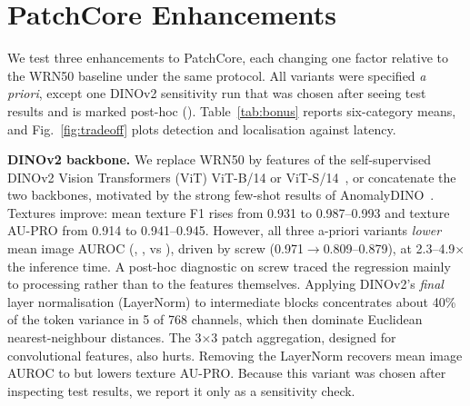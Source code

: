 \section{PatchCore Enhancements}
\label{sec:enh}

We test three enhancements to PatchCore, each changing one factor relative to the WRN50 baseline under the same protocol.
All variants were specified \emph{a priori}, except one DINOv2 sensitivity run that was chosen after seeing test results and is marked post-hoc (\posthoc).
Table~\ref{tab:bonus} reports six-category means, and Fig.~\ref{fig:tradeoff} plots detection and localisation against latency.

\begin{table}[t]
  \centering
  \caption{PatchCore enhancements, six-category means. Bold marks the best value among a-priori variants. \posthoc{}Post-hoc and test-informed; shown as a sensitivity check and not selectable. The input-pyramid and post-processing rows score images by the smoothed-map maximum and should be compared with the max-score control rather than with the Eq.~\eqref{eq:reweight} baseline.}
  \label{tab:bonus}
  \footnotesize
  
\end{table}

\textbf{DINOv2 backbone.}
We replace WRN50 by features of the self-supervised DINOv2 Vision Transformers (ViT) ViT-B/14 or ViT-S/14~\cite{oquab2024dinov2}, or concatenate the two backbones, motivated by the strong few-shot results of AnomalyDINO~\cite{damm2025anomalydino}.
Textures improve: mean texture F1 rises from 0.931 to 0.987--0.993 and texture AU-PRO from 0.914 to 0.941--0.945.
However, all three a-priori variants \emph{lower} mean image AUROC (\bnDinoBImgAuroc{}, \bnDinoSImgAuroc{}, \bnWrnDinoImgAuroc{} vs \bnBaseImgAuroc{}), driven by screw (0.971$\to$0.809--0.879), at 2.3--4.9$\times$ the inference time.
A post-hoc diagnostic on screw traced the regression mainly to processing rather than to the features themselves.
Applying DINOv2's \emph{final} layer normalisation (LayerNorm) to intermediate blocks concentrates about 40\% of the token variance in 5 of 768 channels, which then dominate Euclidean nearest-neighbour distances.
The 3$\times$3 patch aggregation, designed for convolutional features, also hurts.
Removing the LayerNorm recovers mean image AUROC to \bnDinoNoLNImgAuroc{} but lowers texture AU-PRO.
Because this variant was chosen after inspecting test results, we report it only as a sensitivity check.

